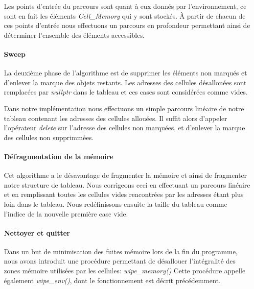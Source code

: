 Les points d'entrée du parcours sont quant à eux donnés par
l'environnement, ce sont en fait les éléments \emph{Cell\_Memory} qui
y sont stockés.  À partir de chacun de ces points d'entrée nous
effectuons un parcours en profondeur permettant ainsi de déterminer
l'ensemble des éléments accessibles.


\paragraph{Sweep}
La deuxième phase de l'algorithme est de supprimer les éléments non
marqués et d'enlever la marque des objets restants. Les adresses des
cellules désallouées sont remplacées par \emph{nullptr} dans le
tableau et ces cases sont considérées comme vides.

Dans notre implémentation nous effectuons un simple parcours linéaire
de notre tableau contenant les adresses des cellules allouées. Il
suffit alors d'appeler l'opérateur \emph{delete} sur l'adresse des
cellules non marquées, et d'enlever la marque des cellules non
supprimmées.

\paragraph{Défragmentation de la mémoire}
Cet algorithme a le désavantage de fragmenter la mémoire et ainsi de
fragmenter notre structure de tableau. Nous corrigeons ceci en
effectuant un parcours linéaire et en remplissant toutes les cellules
vides rencontrées par les adresses étant plus loin dans le
tableau. Nous redéfinissons ensuite la taille du tableau comme
l'indice de la nouvelle première case vide.

\paragraph{Nettoyer et quitter} 
Dans un but de minimisation des fuites mémoire lors de la fin du
programme, nous avons introduit une procédure permettant de désallouer
l'intégralité des zones mémoire utilisées par les cellules:
\emph{wipe\_memory()} Cette procédure appelle également
\emph{wipe\_env()}, dont le fonctionnement est décrit précédemment.

